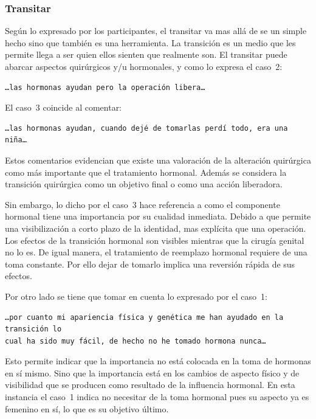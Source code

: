 \subsubsection{Transitar}

Según lo expresado por los participantes, el transitar va mas allá de se un
simple hecho sino que también es una herramienta. La transición es un medio que
les permite llega a ser quien ellos sienten que realmente son. El transitar
puede abarcar aspectos quirúrgicos y/u hormonales, y como lo expresa el caso~2:

\begin{verbatim}
…las hormonas ayudan pero la operación libera…
\end{verbatim}

El caso~3 coincide al comentar:

\begin{verbatim}
…las hormonas ayudan, cuando dejé de tomarlas perdí todo, era una niña…
\end{verbatim}

Estos comentarios evidencian que existe una valoración de la alteración
quirúrgica como más importante que el tratamiento hormonal. Además se considera
la transición quirúrgica como un objetivo final o como una acción liberadora.

Sin embargo, lo dicho por el caso~3 hace referencia a como el componente
hormonal tiene una importancia por su cualidad inmediata. Debido a que permite
una visibilización a corto plazo de la identidad, mas explícita que una
operación. Los efectos de la transición hormonal son visibles mientras que la
cirugía genital no lo es. De igual manera, el tratamiento de reemplazo hormonal
requiere de una toma constante. Por ello dejar de tomarlo implica una reversión
rápida de sus efectos.

Por otro lado se tiene que tomar en cuenta lo expresado por el caso~1:

\begin{verbatim}
…por cuanto mi apariencia física y genética me han ayudado en la transición lo
cual ha sido muy fácil, de hecho no he tomado hormona nunca…
\end{verbatim}

Esto permite indicar que la importancia no está colocada en la toma de hormonas
en sí mismo. Sino que la importancia está en los cambios de aspecto físico y de
visibilidad que se producen como resultado de la influencia hormonal. En esta
instancia el caso~1 indica no necesitar de la toma hormonal pues su aspecto ya
es femenino en sí, lo que es su objetivo último.

